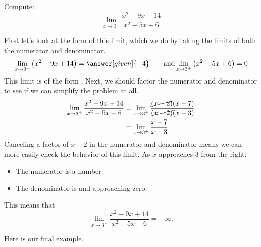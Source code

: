 \documentclass{ximera}
\begin{document}
\begin{example}
  Compute:
  \[
  \lim_{x\to 3^+} \frac{x^2-9x+14}{x^2-5x+6}
  \]
  \begin{explanation}
    First let's look at the form of this limit, which we do by taking the limits of both the numerator and denominator.
    \[
    \lim_{x\to 3^+} \left(x^2-9x+14\right) = \answer[given]{-4}\qquad\text{and}\lim_{x\to3^+}\left(x^2-5x+6\right) = 0
    \]
    This limit is of the form \numOverZero. Next, we should factor the numerator and denominator to see if we can simplify the problem at all. 
    \begin{align*}
      \lim_{x\to 3^+}\frac{x^2-9x+14}{x^2-5x+6} &= \lim_{x\to 3^+}\frac{\cancel{(x-2)}(x-7)}{\cancel{(x-2)}(x-3)}\\
      &= \lim_{x\to 3^+}\frac{x-7}{x-3}
    \end{align*}
    Canceling a factor of $x-2$ in the numerator and denominator
    means we can more easily check the behavior of this limit.  As $x$
    approaches $3$ from the right:
    \begin{itemize}
    \item The numerator is a  number. 
    \item The denominator is  and approaching zero.
    \end{itemize}
    This means that
    \[
    \lim_{x\to 3^+} \frac{x^2-9x+14}{x^2-5x+6} = -\infty.
    \]
   \end{explanation}
\end{example}

Here is our final example.
\end{document}
